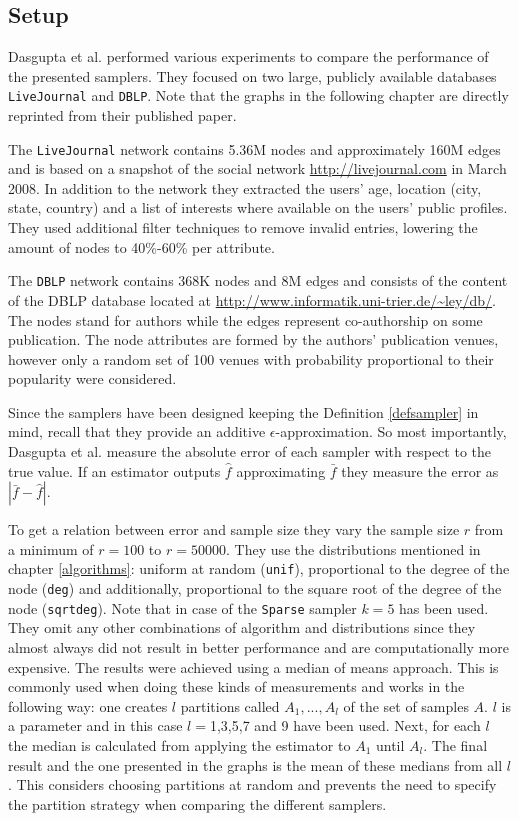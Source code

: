 \subsection{Setup}
Dasgupta et al. \cite{dasgupta2012social} performed various experiments to compare the performance of the presented samplers.
They focused on two large, publicly available databases \texttt{LiveJournal} and \texttt{DBLP}.
Note that the graphs in the following chapter are directly reprinted from their published paper.

The \texttt{LiveJournal} network contains 5.36M nodes and approximately 160M edges and is based on a snapshot of the social network \url{http://livejournal.com} in March 2008. In addition to the network they extracted the users' age, location (city, state, country) and a list of interests where available on the users' public profiles. They used additional filter techniques to remove invalid entries, lowering the amount of nodes to 40\%-60\% per attribute.

The \texttt{DBLP} network contains 368K nodes and 8M edges and consists of the content of the DBLP database located at \url{http://www.informatik.uni-trier.de/~ley/db/}. The nodes stand for authors while the edges represent co-authorship on some publication. The node attributes are formed by the authors' publication venues, however only a random set of 100 venues with probability proportional to their popularity were considered. 

Since the samplers have been designed keeping the Definition \ref{defsampler} in mind, recall that they provide an additive $\epsilon$-approximation. So most importantly, Dasgupta et al. measure the absolute error of each sampler with respect to the true value. If an estimator outputs $\hat{f}$ approximating $\bar{f}$ they measure the error as $|\bar{f}-\hat{f}|$.

To get a relation between error and sample size they vary the sample size $r$ from a minimum of $r = 100$ to $r = 50000$. They use the distributions mentioned in chapter \ref{algorithms}: uniform at random (\texttt{unif}), proportional to the degree of the node (\texttt{deg}) and additionally, proportional to the square root of the degree of the node (\texttt{sqrtdeg}). Note that in case of the \texttt{Sparse} sampler $k = 5$ has been used.
They omit any other combinations of algorithm and distributions since they almost always did not result in better performance and are computationally more expensive. 
The results were achieved using a median of means approach. This is commonly used when doing these kinds of measurements and works in the following way: one creates $l$ partitions called $A_1,...,A_l$ of the set of samples $A$. $l$ is a parameter and in this case $l = $1,3,5,7 and 9 have been used. Next, for each $l$ the median is calculated from applying the estimator to $A_1$ until $A_l$. The final result and the one presented in the graphs is the mean of these medians from all $l$.
This considers choosing partitions at random and prevents the need to specify the partition strategy when comparing the different samplers.

